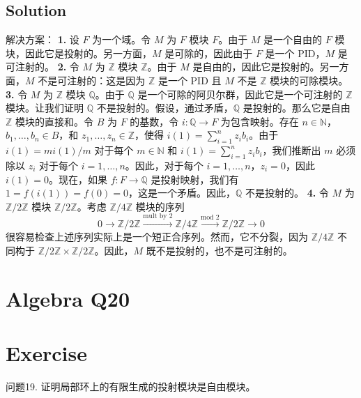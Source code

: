 \documentclass[12pt]{book}
\begin{document}
\subsection*{Solution}
解决方案：
\textbf{1. }设 $F$ 为一个域。令 $M$ 为 $F$ 模块 $F$。由于 $M$ 是一个自由的 $F$ 模块，因此它是投射的。另一方面，$M$ 是可除的，因此由于 $F$ 是一个 PID，$M$ 是可注射的。
\textbf{2. }令 $M$ 为 $\mathbb{Z}$ 模块 $\mathbb{Z}$。由于 $M$ 是自由的，因此它是投射的。另一方面，$M$ 不是可注射的：这是因为 $\mathbb{Z}$ 是一个 PID 且 $M$ 不是 $\mathbb{Z}$ 模块的可除模块。
\textbf{3. }令 $M$ 为 $\mathbb{Z}$ 模块 $\mathbb{Q}$。由于 $\mathbb{Q}$ 是一个可除的阿贝尔群，因此它是一个可注射的 $\mathbb{Z}$ 模块。让我们证明 $\mathbb{Q}$ 不是投射的。假设，通过矛盾，$\mathbb{Q}$ 是投射的。那么它是自由 $\mathbb{Z}$ 模块的直接和。令 $B$ 为 $F$ 的基数，令 $i: \mathbb{Q} \to F$ 为包含映射。存在 $n \in \mathbb{N}$，$b_1, \dots, b_n \in B$，和 $z_1, \dots, z_n \in \mathbb{Z}$，使得 $i(1) = \sum_{i=1}^n z_i b_i$。由于 $i(1) = m i(1)/m$ 对于每个 $m \in \mathbb{N}$ 和 $i(1) = \sum_{i=1}^n z_i b_i$，我们推断出 $m$ 必须除以 $z_i$ 对于每个 $i = 1, \dots, n$。因此，对于每个 $i = 1, \dots, n$，$z_i = 0$，因此 $i(1) = 0$。现在，如果 $f: F \to \mathbb{Q}$ 是投射映射，我们有 $1 = f(i(1)) = f(0) = 0$，这是一个矛盾。因此，$\mathbb{Q}$ 不是投射的。
\textbf{4. }令 $M$ 为 $\mathbb{Z}/2\mathbb{Z}$ 模块 $\mathbb{Z}/2\mathbb{Z}$。考虑 $\mathbb{Z}/4\mathbb{Z}$ 模块的序列
\[ 0 \to \mathbb{Z}/2\mathbb{Z} \xrightarrow{\text{mult by } 2} \mathbb{Z}/4\mathbb{Z} \xrightarrow{\text{mod } 2} \mathbb{Z}/2\mathbb{Z} \to 0 \]
很容易检查上述序列实际上是一个短正合序列。然而，它不分裂，因为 $\mathbb{Z}/4\mathbb{Z}$ 不同构于 $\mathbb{Z}/2\mathbb{Z} \times \mathbb{Z}/2\mathbb{Z}$。因此，$M$ 既不是投射的，也不是可注射的。
\newpage
\section{Algebra Q20}
\section*{Exercise}
问题19. 证明局部环上的有限生成的投射模块是自由模块。
\end{document}
